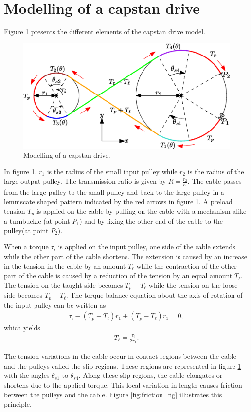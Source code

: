 \documentclass[10pt,cleanfoot]{asme2ej}
\begin{document}
\section{Modelling of a capstan drive}
Figure \ref{fig:model_capstan} presents the different elements of the capstan drive model.
\begin{figure}
    \centering
    \includegraphics[width=0.5\columnwidth]{modelling_of_capstan_drive.eps}
    \caption{Modelling of a capstan drive.}
    \label{fig:model_capstan}
\end{figure}
In figure \ref{fig:model_capstan}, $r_1$ is the radius of the small input pulley while $r_2$ is the radius of the large output pulley. The transmission ratio is given by $R = \frac{r_2}{r_1}$. The cable passes from the large pulley to the small pulley and back to the large pulley in a lemniscate shaped pattern indicated by the red arrows in figure \ref{fig:model_capstan}. A preload tension $T_p$ is applied on the cable by pulling on the cable with a mechanism alike a turnbuckle (at point $P_1$) and by fixing the other end of the cable to the pulley(at point $P_2$).\par
When a torque $\tau_i$ is applied on the input pulley, one side of the cable extends while the other part of the cable shortens. The extension is caused by an increase in the tension in the cable by an amount $T_\ell$ while the contraction of the other part of the cable is caused by a reduction of the tension by an equal amount $T_\ell$. The tension on the taught side becomes $T_p+T_\ell$ while the tension on the loose side becomes $T_p-T_\ell$. The torque balance equation about the axis of rotation of the input pulley can be written as
\begin{align}
    \tau_i - (T_p+T_\ell)r_1 + (T_p-T_\ell)r_1 = 0, \label{eq:first_equation_p0}
\end{align}
which yields
\begin{align}
T_\ell = \frac{\tau_i}{2r_1}.
\label{eq:first_equation}
\end{align}
\par
The tension variations in the cable occur in contact regions between the cable and the pulleys called the slip regions. These regions are represented in figure \ref{fig:model_capstan} with the angles $\theta_{s1}$ to $\theta_{s4}$. Along these slip regions, the cable elongates or shortens due to the applied torque. This local variation in length causes friction between the pulleys and the cable. Figure \ref{fig:friction_fig} illustrates this principle. 
\end{document}
